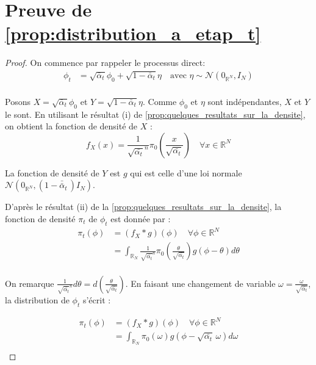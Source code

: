 \documentclass[a4paper,10pt]{article}
\theoremstyle{definition} %
\theoremstyle{definition} %
\theoremstyle{definition} %
\theoremstyle{definition} %
\newcommand{\R}{\mathbb{R}}
\begin{document}
\section{Preuve de \cref{prop:distribution_a_etap_t}} \label{sec:proof_distribution_a_etap_t}
\begin{proof}
    On commence par rappeler le processus direct:
    \begin{align*}
    \phi_t &= \sqrt{\bar \alpha_t}\phi_0 + \sqrt{1-\bar \alpha_t} \eta \quad \text{avec } \eta \sim \mathcal{N}(0_{\R^N},I_N)\\
    \end{align*}

    Posons $X = \sqrt{\bar \alpha_t}\phi_0$ et $Y = \sqrt{1-\bar \alpha_t} \eta$. Comme $\phi_0$ et $\eta$ sont indépendantes, $X$ et $Y$ le sont. En utilisant le résultat (i) de \cref{prop:quelques_resultats_sur_la_densite}, on obtient la fonction de densité de $X$ :
    \[f_X(x) = \frac{1}{\sqrt{\bar{\alpha_t}}^n} \pi_0\left(\frac{x}{\sqrt{\bar{\alpha_t}}}\right) \quad\forall x \in \R^N\]

    La fonction de densité de $Y$ est $g$ qui est celle d'une loi normale $\mathcal{N}\left(0_{\R^N}, (1-\bar \bar \alpha _t\,)I_N\right)$.

    D'après le résultat (ii) de la  \cref{prop:quelques_resultats_sur_la_densite}, la fonction de densité $\pi_t$ de $\phi_t$ est donnée par :
    \begin{align*}
        \pi_t(\phi) &= (f_X*g)(\phi) \quad \forall\phi\in \R^N \\
        &= \int_{\R_N} \frac{1}{\sqrt{\bar{\alpha_t}}^n} \pi_0\left(\frac{\theta}{\sqrt{\bar{\alpha_t}}}\right) g(\phi -\theta) d\theta\\
    \end{align*}

    On remarque $\frac{1}{\sqrt{\bar{\alpha_t}}^n} d\theta = d\left(\frac{\theta}{\sqrt{\bar{\alpha_t}}}\right)$. En faisant une changement de variable $\omega = \frac{\omega}{\sqrt{\bar{\alpha_t}}}$, la distribution de $\phi_t$ s'écrit :
    
    \begin{align*}
        \pi_t(\phi) &= (f_X*g)(\phi) \quad \forall\phi\in \R^N \\
        &= \int_{\R_N}  \pi_0(\omega) g(\phi -\sqrt{\bar{\alpha_t}}\,\omega) d\omega\\
    \end{align*}
\end{proof}
\end{document}
